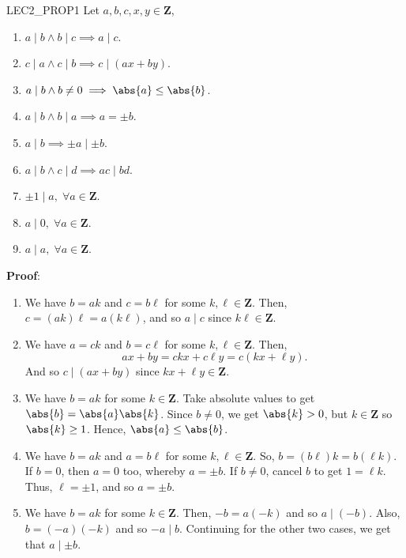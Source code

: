 \begin{Proposition}{}{LEC2_PROP1}
    Let $ a,b,c,x,y\in\mathbf{Z} $,
    \begin{enumerate}[(1)]
        \item $ a\mid b \land b\mid c \implies a\mid c $.
        \item $ c\mid a\land c\mid b\implies c\mid(ax+by) $.
        \item $ a\mid b \land b\ne 0 \implies \abs{a}\le\abs{b} $.
        \item $ a\mid b \land b\mid a \implies a=\pm b $.
        \item $ a\mid b \implies \pm a\mid \pm b $.
        \item $ a\mid b \land c\mid d \implies ac\mid bd $.
        \item $ \pm 1\mid a,\;\forall a\in\mathbf{Z} $.
        \item $ a\mid 0,\;\forall a\in\mathbf{Z} $.
        \item $ a\mid a,\;\forall a\in\mathbf{Z} $.
    \end{enumerate}
    \tcblower{}
    \textbf{Proof}:
    \begin{enumerate}[(1)]
        \item We have $ b=ak $ and $ c=b\ell $ for some $ k,\ell\in\mathbf{Z} $. Then, $ c=(ak)\ell=a(k\ell) $,
              and so $ a\mid c $ since $ k\ell\in\mathbf{Z} $.
        \item We have $ a=ck $ and $ b=c\ell $ for some $ k,\ell\in\mathbf{Z} $. Then,
              \[ ax+by=ckx+c\ell y=c(kx+\ell y). \]
              And so $ c\mid (ax+by) $ since $ kx+\ell y\in\mathbf{Z} $.
        \item We have $ b=ak $ for some $ k\in\mathbf{Z} $. Take absolute values to get $ \abs{b}=\abs{a}\abs{k} $.
              Since $ b\ne 0 $, we get $ \abs{k}>0 $, but $ k\in\mathbf{Z} $ so $ \abs{k}\ge 1 $. Hence, $ \abs{a}\le \abs{b} $.
        \item We have $ b=ak $ and $ a=b\ell $ for some $ k,\ell\in\mathbf{Z} $. So, $ b=(b\ell)k=b(\ell k) $.
              If $ b=0 $, then $ a=0 $ too, whereby $ a=\pm b $. If $ b\ne 0 $, cancel $ b $ to get $ 1=\ell k $. Thus,
              $ \ell=\pm 1 $, and so $ a=\pm b $.
        \item We have $ b=ak $ for some $ k\in\mathbf{Z} $. Then, $ -b=a(-k) $ and so $ a\mid(-b) $. Also,
              $ b=(-a)(-k) $ and so $ -a\mid b $. Continuing for the other two cases, we get that $ a\mid \pm b $.
    \end{enumerate}
\end{Proposition}
